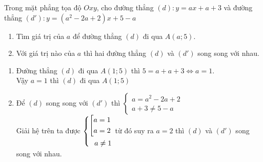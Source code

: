 \begin{ex}%
Trong mặt phẳng tọa độ $Oxy$, cho đường thẳng $(d): y = ax +a+3$ và đường thẳng $(d'): y = (a^2-2a+2)x+5 - a$
\begin{enumerate}
\item Tìm giá trị của $a$ để đường thẳng $(d)$ đi qua $A(a; 5)$.
\item Với giá trị nào của $a$ thì hai đường thẳng $(d)$ và $(d')$ song song với nhau.
\end{enumerate}
\loigiai
    {
    \begin{enumerate}
        \item Đường thẳng $(d)$ đi qua $A(1;5)$ thì $5 = a+a+3 \Leftrightarrow a = 1$.\\
        Vậy $a = 1$ thì $(d)$ đi qua $A(1; 5)$
        \item Để $(d)$ song song với $(d')$ thì 
        $
        \begin{cases}
        a = a^2-2a+2\\
        a+3\ne 5-a
        \end{cases}
        $\\
        Giải hệ trên ta được $\left\{\begin{aligned}\left[\begin{aligned}a = 1\\ a = 2\end{aligned}\right.\\ a \ne 1\end{aligned}\right.$
        từ đó suy ra $a = 2$ thì $(d)$ và $(d')$ song song với nhau.
    \end{enumerate}
    }
\end{ex}

